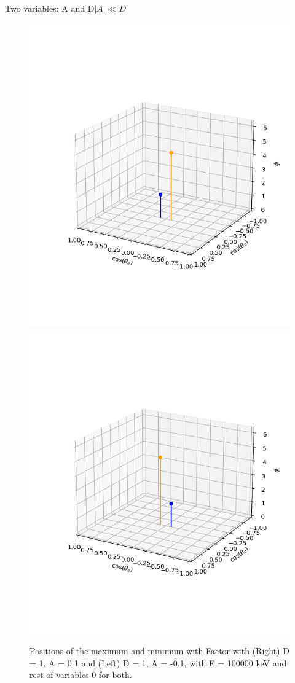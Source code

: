 \documentclass{beamer}
\begin{document}
\begin{frame}{Two variables: A and D}{$|A|\ll D$}
	\begin{figure}
		\centering
		\includegraphics[width=0.4\paperwidth]{plots/posD_xsposA_max_min}
		\includegraphics[width=0.4\paperwidth]{plots/posD_xsnegA_max_min}
		\caption{Positions of the maximum and minimum with Factor with (Right) D = 1, A = 0.1 and (Left) D = 1, A = -0.1, with E = 100000 keV and rest of variables 0 for both.}
	\end{figure}
\end{frame}
\end{document}

